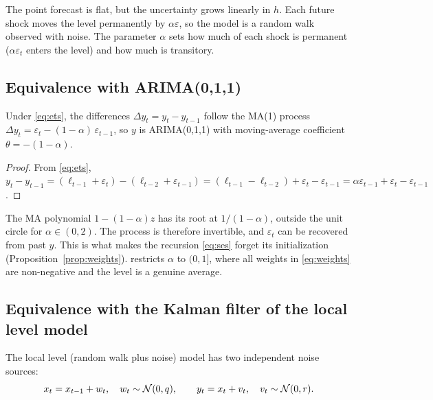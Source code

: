 \documentclass[11pt,a4paper]{article}
\begin{document}
The point forecast is flat, but the uncertainty grows linearly in $h$. Each
future shock moves the level permanently by $\alpha\varepsilon$, so the model is a random walk observed with noise.
The parameter $\alpha$ sets how much of each shock is
permanent ($\alpha\varepsilon_t$ enters the level) and how much is transitory.

\subsection{Equivalence with ARIMA(0,1,1)}

\begin{proposition}\label{prop:arima}
Under \eqref{eq:ets}, the differences $\Delta y_t = y_t - y_{t-1}$ follow the
MA(1) process $\Delta y_t = \varepsilon_t - (1-\alpha)\,\varepsilon_{t-1}$, so $y$
is ARIMA(0,1,1) with moving-average coefficient $\theta=-(1-\alpha)$.
\end{proposition}
\begin{proof}
From \eqref{eq:ets},
$y_t - y_{t-1} = (\ell_{t-1}+\varepsilon_t)-(\ell_{t-2}+\varepsilon_{t-1}) = (\ell_{t-1}-\ell_{t-2}) + \varepsilon_t-\varepsilon_{t-1}
= \alpha\varepsilon_{t-1}+\varepsilon_t-\varepsilon_{t-1}$.
\end{proof}

The MA polynomial $1-(1-\alpha)z$ has its root at $1/(1-\alpha)$, outside the
unit circle for $\alpha\in(0,2)$. The process is therefore invertible, and $\varepsilon_t$ can be
recovered from past $y$. This is what makes the recursion \eqref{eq:ses}
forget its initialization (Proposition~\ref{prop:weights}). 
restricts $\alpha$ to $(0,1]$, where all weights in \eqref{eq:weights} are
non-negative and the level is a genuine average.

\subsection{Equivalence with the Kalman filter of the local level model}

The local level (random walk plus noise) model has two independent noise sources:
\begin{equation}\label{eq:local-level}
  x_t = x_{t-1} + w_t,\quad w_t\sim\mathcal{N}(0,q),\qquad
  y_t = x_t + v_t,\quad v_t\sim\mathcal{N}(0,r).
\end{equation}
\end{document}
